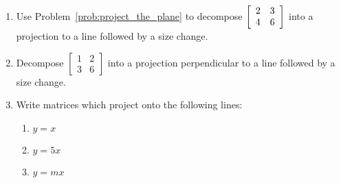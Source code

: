 \documentclass[../gatm.tex]{subfiles}
\begin{document}
\begin{enumerate}
\item Use Problem~\ref{prob:project_the_plane} to decompose $\left[\begin{array}{cc} 2 & 3 \\ 4 & 6 \end{array}\right]$ into a projection to a line followed by a size change.
\item Decompose $\left[\begin{array}{cc} 1 & 2 \\ 3 & 6\end{array}\right]$ into a projection perpendicular to a line followed by a size change.
\item Write matrices which project onto the following lines:
\begin{multicols}{3}
\begin{enumerate}
\item $y=x$
\item $y=5x$
\item $y=mx$
\end{enumerate}
\end{multicols}
\end{enumerate}
\end{document}
